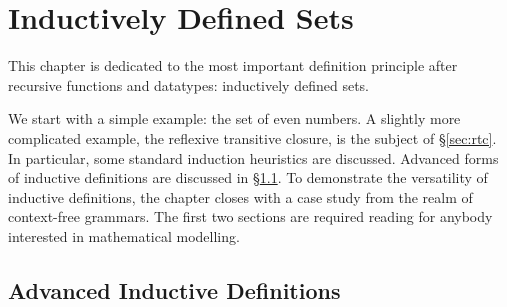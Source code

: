 \chapter{Inductively Defined Sets} \label{chap:inductive}

This chapter is dedicated to the most important definition principle after
recursive functions and datatypes: inductively defined sets.

We start with a simple example: the set of even numbers.  A slightly more
complicated example, the reflexive transitive closure, is the subject of
{\S}\ref{sec:rtc}. In particular, some standard induction heuristics are
discussed. Advanced forms of inductive definitions are discussed in
{\S}\ref{sec:adv-ind-def}. To demonstrate the versatility of inductive
definitions, the chapter closes with a case study from the realm of
context-free grammars. The first two sections are required reading for anybody
interested in mathematical modelling.





\section{Advanced Inductive Definitions}
\label{sec:adv-ind-def}




